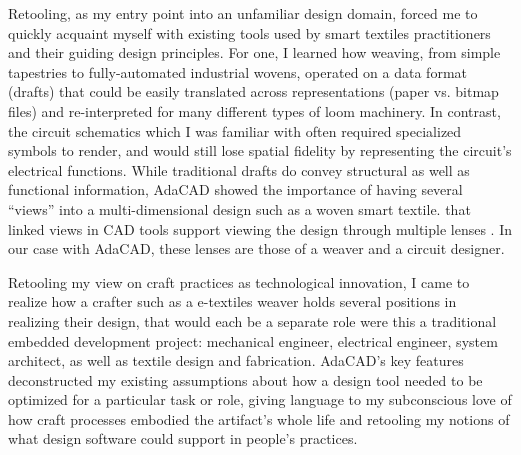 Retooling, as my entry point into an unfamiliar design domain, forced me to quickly acquaint myself with existing tools used by smart textiles practitioners and their guiding design principles. For one, I learned how weaving, from simple tapestries to fully-automated industrial wovens, operated on a data format (drafts) that could be easily translated across representations (paper vs. bitmap files) and re-interpreted for many different types of loom machinery. In contrast, the circuit schematics which I was familiar with often required specialized symbols to render, and would still lose spatial fidelity by representing the circuit's electrical functions. While traditional drafts do convey structural as well as functional information, AdaCAD showed the importance of having several ``views'' into a multi-dimensional design such as a woven smart textile. 
 that linked views in CAD tools support viewing the design through multiple lenses \cite{jacobs_codeable_2013}. In our case with AdaCAD, these lenses are those of a weaver and a circuit designer. 

Retooling my view on craft practices as technological innovation, I came to realize how a crafter such as a e-textiles weaver holds several positions in realizing their design, that would each be a separate role were this a traditional embedded development project: mechanical engineer, electrical engineer, system architect, as well as textile design and fabrication. AdaCAD's key features deconstructed my existing assumptions about how a design tool needed to be optimized for a particular task or role, giving language to my subconscious love of how craft processes embodied the artifact's whole life and retooling my notions of what design software could support in people's practices.


